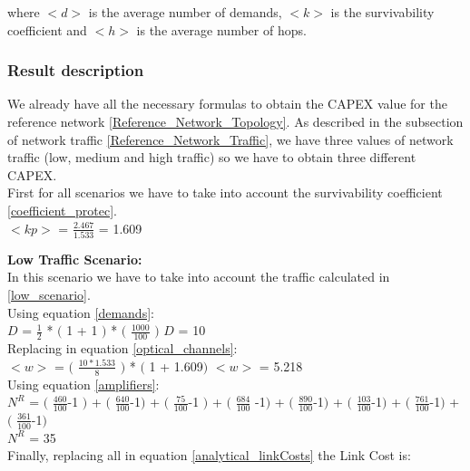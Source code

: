 where $<d>$ is the average number of demands, $<k>$	is the survivability coefficient and $<h>$ is the average number of hops.\\


\subsubsection{Result description}

We already have all the necessary formulas to obtain the CAPEX value for the reference network \ref{Reference_Network_Topology}. As described in the subsection of network traffic \ref{Reference_Network_Traffic}, we have three values of network traffic (low, medium and high traffic) so we have to obtain three different CAPEX.\\
First for all scenarios we have to take into account the survivability coefficient \ref{coefficient_protec}.\\

$<kp>$ = $\frac{2.467}{1.533}$ = 1.609

\textbf{Low Traffic Scenario:}\\
In this scenario we have to take into account the traffic calculated in \ref{low_scenario}.\\

Using equation \ref{demands}:\\

$D$ = $\frac{1}{2}$ * $($ 1 + 1 $)$ * $($ $\frac{1000}{100}$ $)$ \qquad \qquad $D$ = 10\\

Replacing in equation \ref{optical_channels}:\\

$<w>$ = $($ $\frac{10 * 1.533}{8}$ $)$ * $($ 1 + 1.609$)$ \qquad \qquad $<w>$ = 5.218\\

Using equation \ref{amplifiers}:\\

$N^R$ = $($ $\frac{460}{100}$-1 $)$ + $($ $\frac{640}{100}$-1$)$ + $($ $\frac{75}{100}$-1 $)$ + $($ $\frac{684}{100}$ -1$)$ + $($ $\frac{890}{100}$-1$)$ + $($ $\frac{103}{100}$-1$)$ + $($ $\frac{761}{100}$-1$)$ + $($ $\frac{361}{100}$-1$)$\\

$N^R$ = 35\\

Finally, replacing all in equation \ref{analytical_linkCosts} the Link Cost is:\\

